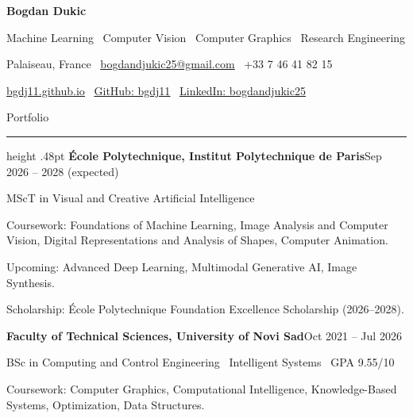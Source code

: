 \documentclass[10pt,a4paper]{article}
\newcommand{\CVText}{\fontsize{9.52}{10.85}\selectfont}
\newcommand{\CVSm}{\fontsize{9.18}{10.55}\selectfont}
\newcommand{\cvsection}[1]{\vspace{5.5pt}\noindent{\fontsize{11.0}{12.4}\selectfont\bfseries #1}\par\vspace{2.0pt}\hrule height .48pt\vspace{3.4pt}}
\newcommand{\entry}[2]{\noindent\textbf{#1}\hfill{\CVSm #2}\par}
\begin{document}
\CVText
\begin{minipage}[t]{0.86\textwidth}
  {\fontsize{19}{20}\selectfont\bfseries Bogdan Dukic}\par\vspace{0.5pt}
  {\fontsize{9.75}{11.2}\selectfont Machine Learning \textbar\ Computer Vision \textbar\ Computer Graphics \textbar\ Research Engineering}\par\vspace{1.5pt}
  Palaiseau, France \textbar\ \href{mailto:bogdandjukic25@gmail.com}{\underline{bogdandjukic25@gmail.com}} \textbar\ +33 7 46 41 82 15\par\vspace{0.5pt}
  \href{https://bgdj11.github.io/}{\underline{bgdj11.github.io}} \textbar\ \href{https://github.com/bgdj11}{\underline{GitHub: bgdj11}} \textbar\ \href{https://www.linkedin.com/in/bogdandjukic25/}{\underline{LinkedIn: bogdandjukic25}}
\end{minipage}\hfill\begin{minipage}[t]{0.11\textwidth}
\centering\vspace{-5pt}\par{\fontsize{7}{8}\selectfont Portfolio}
\end{minipage}
\vspace{1pt}

\cvsection{EDUCATION}
\entry{École Polytechnique, Institut Polytechnique de Paris}{Sep 2026 -- 2028 (expected)}
MScT in Visual and Creative Artificial Intelligence\par
Coursework: Foundations of Machine Learning, Image Analysis and Computer Vision, Digital Representations and Analysis of Shapes, Computer Animation.\par
Upcoming: Advanced Deep Learning, Multimodal Generative AI, Image Synthesis.\par
\hspace*{10pt}Scholarship: École Polytechnique Foundation Excellence Scholarship (2026--2028).\par
\vspace{4pt}
\entry{Faculty of Technical Sciences, University of Novi Sad}{Oct 2021 -- Jul 2026}
BSc in Computing and Control Engineering \textbar\ Intelligent Systems \textbar\ GPA 9.55/10\par
Coursework: Computer Graphics, Computational Intelligence, Knowledge-Based Systems, Optimization, Data Structures.\par
{}\par
\end{document}
